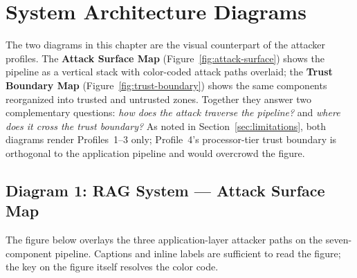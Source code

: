 \documentclass[a4paper,12pt]{report}
\begin{document}
\chapter{System Architecture Diagrams}

The two diagrams in this chapter are the visual counterpart of the
attacker profiles. The \textbf{Attack Surface Map}
(Figure~\ref{fig:attack-surface}) shows the pipeline as a vertical stack
with color-coded attack paths overlaid; the \textbf{Trust Boundary Map}
(Figure~\ref{fig:trust-boundary}) shows the same components reorganized
into trusted and untrusted zones. Together they answer two complementary
questions: \emph{how does the attack traverse the pipeline?} and
\emph{where does it cross the trust boundary?} As noted in
Section~\ref{sec:limitations}, both diagrams render Profiles~1--3 only;
Profile~4's processor-tier trust boundary is orthogonal to the
application pipeline and would overcrowd the figure.

\section{Diagram 1: RAG System --- Attack Surface Map}

The figure below overlays the three application-layer attacker paths on
the seven-component pipeline. Captions and inline labels are sufficient
to read the figure; the key on the figure itself resolves the color code.
\end{document}
